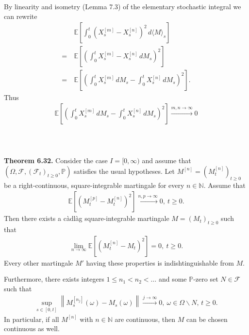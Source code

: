 \documentclass{beamer}
\numberwithin{equation}{section}
\newenvironment{frame2}{\begin{frame}\frametitle{{\normalsize \secname} \\ {\large \subsecname}}}{\end{frame}}
\begin{document}
\begin{frame2}
    By linearity and isometry (Lemma 7.3) of the elementary stochastic integral we can rewrite
    \begin{align*}
        &\mathbb{E}\left[\int_0^t (X_s^{[m]} - X^{[n]}_s)^2 \, d\langle M \rangle_s\right] \\
        =\ &\mathbb{E}\left[\left(\int_0^t X_s^{[m]} - X^{[n]}_s \, dM_s\right)^2\right] \\
        =\ &\mathbb{E}\left[\left(\int_0^t X_s^{[m]}\, dM_s - \int_0^tX^{[n]}_s \, dM_s\right)^2\right].
    \end{align*}
    Thus 
    \begin{align}
        \mathbb{E}\left[\left(\int_0^t X_s^{[m]}\, dM_s - \int_0^tX^{[n]}_s \, dM_s\right)^2\right] \xrightarrow{m,n\to\infty}0
    \end{align}
\end{frame2}

\begin{frame2}
    \begingroup
    \footnotesize
    \textbf{Theorem 6.32.}
    Consider the case $I = [0,\infty)$ and assume that $(\Omega, \mathcal{F}, (\mathcal{F}_t)_{t \geq 0},\mathbb{P})$ satisfies the usual hypotheses.
    Let $M^{[n]} = (M_t^{[n]})_{t\geq 0}$ be a right-continuous, square-integrable martingale for every $n \in \mathbb{N}$.
    Assume that
    \begin{align}
        \mathbb{E}\left[(M_t^{[p]} - M_t^{[n]})^2\right] \xrightarrow{n, p \to\infty} 0, \ t \geq 0.
    \end{align}
    Then there exists a càdlàg square-integrable martingale $M = \left(M_t\right)_{t \geq 0}$ such that
    \begin{align}
        \lim_{n \to \infty} \mathbb{E}\left[(M_t^{[n]} - M_t)^2\right] = 0, \ t \geq 0.
    \end{align}
    Every other martingale $M'$ having these properties is indishtinguishable from $M$.
    \vspace{10pt}

    \begingroup
    \tiny
    \color{gray}
    Furthermore, there exists integers $ 1 \leq n_1 < n_2 < \ldots$ and some $\mathbb{P}$-zero set $N\in \mathcal{F}$ such that
    \begin{align}
        \sup_{s \in [0,t]} \left\|M_s^{[n_j]}(\omega) - M_s(\omega) \right\| \xrightarrow{j \to \infty} 0, \ \omega \in \Omega\backslash N, \, t \geq 0.
    \end{align}
    In particular, if all $M^{[n]}$ with $n \in \mathbb{N}$ are continuous, then $M$ can be chosen continuous as well.
    \endgroup
    \endgroup
\end{frame2}
\end{document}
